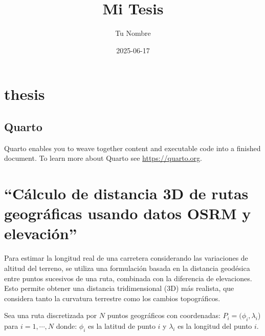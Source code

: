 \documentclass[
  letterpaper,
  DIV=11,
  numbers=noendperiod]{scrreprt}
\title{Mi Tesis}
\author{Tu Nombre}
\date{2025-06-17}
\renewcommand*\contentsname{Table of contents}
\newcommand\contentsname{Table of contents}
\begin{document}
\maketitle

\renewcommand*\contentsname{Table of contents}
{
\hypersetup{linkcolor=}
\setcounter{tocdepth}{2}
\tableofcontents
}


\chapter{thesis}\label{thesis}

\section{Quarto}\label{quarto}

Quarto enables you to weave together content and executable code into a
finished document. To learn more about Quarto see
\url{https://quarto.org}.


\chapter{}\label{section}


\chapter{}\label{section-1}


\chapter{``Cálculo de distancia 3D de rutas geográficas usando datos
OSRM y
elevación''}\label{cuxe1lculo-de-distancia-3d-de-rutas-geogruxe1ficas-usando-datos-osrm-y-elevaciuxf3n}

Para estimar la longitud real de una carretera considerando las
variaciones de altitud del terreno, se utiliza una formulación basada en
la distancia geodésica entre puntos sucesivos de una ruta, combinada con
la diferencia de elevaciones. Esto permite obtener una distancia
tridimensional (3D) más realista, que considera tanto la curvatura
terrestre como los cambios topográficos.

Sea una ruta discretizada por \(N\) puntos geográficos con coordenadas:
\(P_i= (\phi_i, \lambda_i\)) para \(i=1, \cdots, N\) donde: \(\phi_i\)
es la latitud de punto \(i\) y \(\lambda_i\) es la longitud del punto
\(i\).
\end{document}
